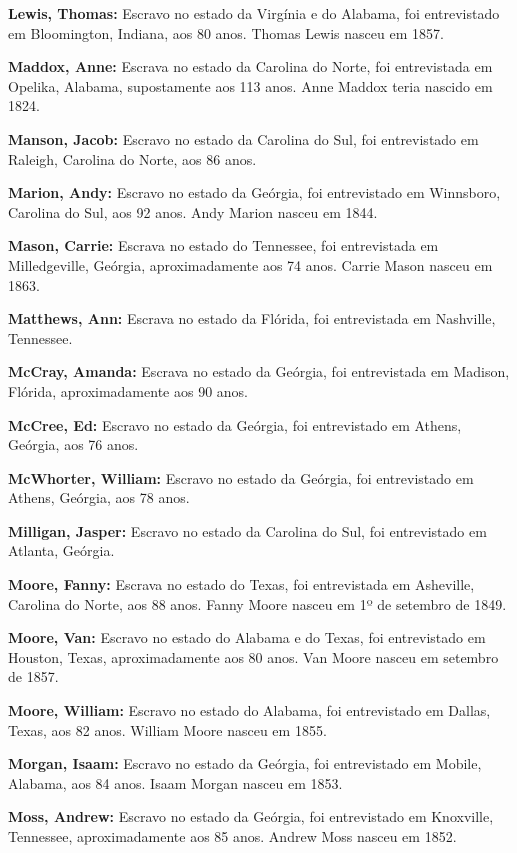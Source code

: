 \textbf{Lewis, Thomas:} Escravo no estado da Virgínia e do Alabama, foi
entrevistado em Bloomington, Indiana, aos 80 anos. Thomas Lewis nasceu
em 1857.

\textbf{Maddox, Anne:} Escrava no estado da Carolina do Norte, foi
entrevistada em Opelika, Alabama, supostamente aos 113 anos. Anne Maddox
teria nascido em 1824.

\textbf{Manson, Jacob:} Escravo no estado da Carolina do Sul, foi
entrevistado em Raleigh, Carolina do Norte, aos 86 anos.

\textbf{Marion, Andy:} Escravo no estado da Geórgia, foi entrevistado em
Winnsboro, Carolina do Sul, aos 92 anos. Andy Marion nasceu em 1844.

\textbf{Mason, Carrie:} Escrava no estado do Tennessee, foi entrevistada
em Milledgeville, Geórgia, aproximadamente aos 74 anos. Carrie Mason
nasceu em 1863.

\textbf{Matthews, Ann:} Escrava no estado da Flórida, foi entrevistada
em Nashville, Tennessee.

\textbf{McCray, Amanda:} Escrava no estado da Geórgia, foi entrevistada
em Madison, Flórida, aproximadamente aos 90 anos.

\textbf{McCree, Ed:} Escravo no estado da Geórgia, foi entrevistado em
Athens, Geórgia, aos 76 anos.

\textbf{McWhorter, William:} Escravo no estado da Geórgia, foi
entrevistado em Athens, Geórgia, aos 78 anos.

\textbf{Milligan, Jasper:} Escravo no estado da Carolina do Sul, foi
entrevistado em Atlanta, Geórgia.

\textbf{Moore, Fanny:} Escrava no estado do Texas, foi entrevistada em
Asheville, Carolina do Norte, aos 88 anos. Fanny Moore nasceu em 1º de
setembro de 1849.

\textbf{Moore, Van:} Escravo no estado do Alabama e do Texas, foi
entrevistado em Houston, Texas, aproximadamente aos 80 anos. Van Moore
nasceu em setembro de 1857.

\textbf{Moore, William:} Escravo no estado do Alabama, foi entrevistado
em Dallas, Texas, aos 82 anos. William Moore nasceu em 1855.

\textbf{Morgan, Isaam:} Escravo no estado da Geórgia, foi entrevistado
em Mobile, Alabama, aos 84 anos. Isaam Morgan nasceu em 1853.

\textbf{Moss, Andrew:} Escravo no estado da Geórgia, foi entrevistado em
Knoxville, Tennessee, aproximadamente aos 85 anos. Andrew Moss nasceu em
1852.

